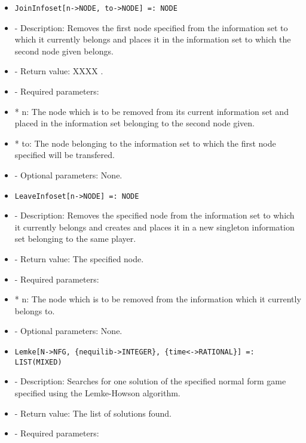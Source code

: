 \begin{itemize}
\item
\begin{verbatim}
JoinInfoset[n->NODE, to->NODE] =: NODE
\end{verbatim}

\bd
\item
- Description:  Removes the first node specified from the information set
to which it currently belongs and places it in the information set to
which the second node given belongs.
\item
- Return value:  XXXX .
\item
- Required parameters:
	  
\bd
\item
*  n:  The node which is to be removed from its current information
set and placed in the information set belonging to the second
node given.
\item
*  to:  The node belonging to the information set to which the first
node specified will be transfered.
\ed

\item
- Optional parameters:  None.
\ed

\item
\begin{verbatim}
LeaveInfoset[n->NODE] =: NODE
\end{verbatim}

\bd
\item
- Description:  Removes the specified node from the information set to
which it currently belongs and creates and places it in a new singleton
information set belonging to the same player.
\item
- Return value:  The specified node.
\item
- Required parameters:
	  
\bd
\item
*  n:  The node which is to be removed from the information which it
currently belongs to.
\ed

\item
- Optional parameters:  None.
\ed

\item
\begin{verbatim}
Lemke[N->NFG, {nequilib->INTEGER}, {time<->RATIONAL}] =: LIST(MIXED)
\end{verbatim}

\bd
\item
- Description:  Searches for one solution of the specified normal form 
game specified using the Lemke-Howson algorithm.  
\item
- Return value:  The list of solutions found.
\item
- Required parameters:


\end{itemize}
